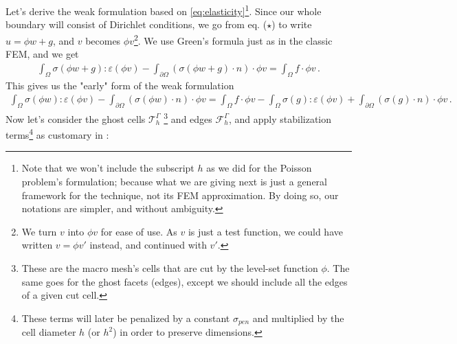 Let's derive the weak formulation based on \eqref{eq:elasticity}\footnote{Note that we won't include the subscript $h$ as we did for the Poisson problem's \phifem formulation; because what we are giving next is just a general framework for the technique, not its FEM approximation. By doing so, our notations are simpler, and without ambiguity.}. Since our whole boundary will consist of Dirichlet conditions, we go from eq. ($\star$) to write $u=\phi w + g$, and $v$ becomes $\phi v$\footnote{We turn $v$ into $\phi v$ for ease of use. As $v$ is just a test function, we could have written $v = \phi v'$ instead, and continued with $v'$.}. We use Green's formula just as in the classic FEM, and we get
\begin{align*}
    \int_{\Omega} \sigma(\phi w + g) : \varepsilon(\phi v) - \int_{\partial\Omega} (\sigma(\phi w + g) \cdot n)  \cdot \phi v = \int_{\Omega} f \cdot \phi v \,.
\end{align*}
This gives us the "early" form of the weak formulation
\begin{align}
    \int_{\Omega} \sigma(\phi w) : \varepsilon(\phi v) - \int_{\partial\Omega} (\sigma(\phi w) \cdot n) \cdot \phi v = \int_{\Omega} f \cdot \phi v - \int_{\Omega} \sigma(g) : \varepsilon(\phi v) + \int_{\partial\Omega} (\sigma(g) \cdot n) \cdot \phi  v \,.
    \label{eq:1}
\end{align}
Now let's consider the ghost cells $\mathcal{T}_h^{\Gamma}$ \footnote{These are the macro mesh's cells that are cut by the level-set function $\phi$. The same goes for the ghost facets (edges), except we should include all the edges of a given cut cell.} and edges $\mathcal{F}_h^{\Gamma}$, and apply stabilization terms\footnote{These terms will later be penalized by a constant $\sigma_{pen}$ and multiplied by the cell diameter $h$ (or $h^2$) in order to preserve dimensions.} as customary in \phifem :
